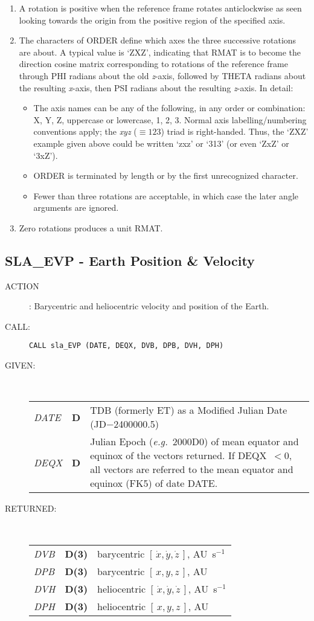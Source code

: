 \documentclass[11pt,twoside]{article}
\newcommand{\xlabel}[1]{}
\newcommand{\xyz}       {$[\,x,y,z\,]$}
\newcommand{\xyzd}      {$[\,\dot{x},\dot{y},\dot{z}\,]$}
\newcommand{\routine}[3]
{\hbadness=10000
  \vbox
  {
    \rule{\textwidth}{0.3mm}\\
    {\Large {\bf #1} \hfill #2 \hfill {\bf #1}}\\
    \setlength{\oldspacing}{\topsep}
    \setlength{\topsep}{0.3ex}
    \begin{description}
      #3
    \end{description}
    \setlength{\topsep}{\oldspacing}
  }
}
\renewcommand{\routine}[3]
   {
      \subsection{#1\xlabel{#1} - #2\label{#1}}
       \begin{description}
         #3
       \end{description}
   }
\newcommand{\action}[1]
{\item[ACTION]: #1}
\newcommand{\action}[1]
   {\item[ACTION:] #1}
\newcommand{\call}[1]
{\item[CALL]: \hspace{0.4em}{\tt #1}}
\newlength{\oldspacing}
\renewcommand{\call}[1]
   {
    \item[CALL:] {\tt #1}
   }
\newcommand{\args}[2]
{
  \goodbreak
  \setlength{\oldspacing}{\topsep}
  \setlength{\topsep}{0.3ex}
  \begin{description}
  \item[#1]:\\[1.5ex]
    \begin{tabular}{p{7em}p{6em}p{22em}}
      #2
    \end{tabular}
  \end{description}
  \setlength{\topsep}{\oldspacing}
}
\renewcommand{\args}[2]
   {
     \begin{description}
        \item[#1:]\\
        \begin{tabular}{p{7em}p{6em}l}
           #2
        \end{tabular}
     \end{description}
   }
\newcommand{\spec}[3]
{
  {\em {#1}} & {\bf \mbox{#2}} & {#3}
}
\begin{document}
{
 \begin{enumerate}
  \item A rotation is positive when the reference frame rotates
        anticlockwise as seen looking towards the origin from the
        positive region of the specified axis.
  \item The characters of ORDER define which axes the three successive
        rotations are about.  A typical value is `ZXZ', indicating that
        RMAT is to become the direction cosine matrix corresponding to
        rotations of the reference frame through PHI radians about the
        old {\it z}-axis, followed by THETA radians about the resulting
        {\it x}-axis,
        then PSI radians about the resulting {\it z}-axis.  In detail:
        \begin{itemize}
         \item The axis names can be any of the following, in any order or
               combination:  X, Y, Z, uppercase or lowercase, 1, 2, 3.  Normal
               axis labelling/numbering conventions apply;
               the {\it xyz} ($\equiv123$)
               triad is right-handed.  Thus, the `ZXZ' example given above
               could be written `zxz' or `313' (or even `ZxZ' or `3xZ').
         \item ORDER is terminated by length or by the first unrecognized
               character.
         \item Fewer than three rotations are acceptable, in which case
               the later angle arguments are ignored.
        \end{itemize}
  \item Zero rotations produces a unit RMAT.
 \end{enumerate}
}
\routine{SLA\_EVP}{Earth Position \& Velocity}
{
 \action{Barycentric and heliocentric velocity and position of the Earth.}
 \call{CALL sla\_EVP (DATE, DEQX, DVB, DPB, DVH, DPH)}
}
\args{GIVEN}
{
 \spec{DATE}{D}{TDB (formerly ET) as a Modified Julian Date
                                        (JD$-$2400000.5)} \\
 \spec{DEQX}{D}{Julian Epoch ({\it e.g.}\ 2000D0) of mean equator and
                equinox of the vectors returned.  If DEQX~$<0$,
                  all vectors are referred to the mean equator and
                  equinox (FK5) of date DATE.}
}
\args{RETURNED}
{
 \spec{DVB}{D(3)}{barycentric \xyzd, AU~s$^{-1}$} \\
 \spec{DPB}{D(3)}{barycentric \xyz, AU} \\
 \spec{DVH}{D(3)}{heliocentric \xyzd, AU~s$^{-1}$} \\
 \spec{DPH}{D(3)}{heliocentric \xyz, AU}
}
\end{document}
